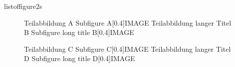 \documentclass[a4paper]{article}
\begin{document}
\listoffigures
\csname listoffigure2s\endcsname

\begin{figure}[!htb]
  \centering
  \bisubcaptionbox
    {Teilabbildung A\label{fig:test:A}}
    {Subfigure A}[0.4\textwidth]{IMAGE}%
  \qquad
  \bisubcaptionbox
    {Teilabbildung langer Titel B\label{fig:test:B}}
    {Subfigure long title B}[0.4\textwidth]{IMAGE}%
  \label{fig:test}
\end{figure}

\begin{figure}[!htb]
  \centering
  \bisubcaptionbox
    {Teilabbildung C\label{fig:test:C}}
    {Subfigure C}[0.4\textwidth]{IMAGE}%
  \qquad
  \bisubcaptionbox
    {Teilabbildung langer Titel D\label{fig:test:D}}
    {Subfigure long title D}[0.4\textwidth]{IMAGE}%
  \label{fig:test2}
\end{figure}
\end{document}
